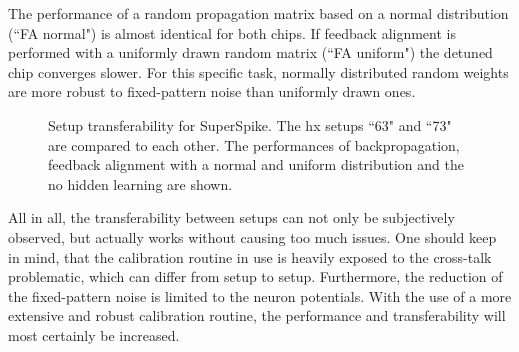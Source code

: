The performance of a random propagation matrix based on a normal distribution (``FA normal") is almost identical for both chips. If feedback alignment is performed with a uniformly drawn random matrix (``FA uniform") the detuned chip converges slower. For this specific task, normally distributed random weights are more robust to fixed-pattern noise than uniformly drawn ones. 
\begin{figure}[htb!]
	\begin{subfigure}{0.245\textwidth}
		\caption{}
		\vspace{-0.3cm}
		\centering
		
		\label{hx63vs73bp}
	\end{subfigure}
	\begin{subfigure}{0.245\textwidth}
		\caption{}
		\vspace{-0.3cm}
		\centering
		
		\label{hx63vs73fanormal}
	\end{subfigure}
	\begin{subfigure}{0.245\textwidth}
		\caption{}
		\vspace{-0.3cm}
		\centering
		
		\label{hx63vs73fauniform}
	\end{subfigure}
	\begin{subfigure}{0.245\textwidth}
		\caption{}
		\vspace{-0.3cm}
		\centering
		
		\label{hx63vs73nohidden}
	\end{subfigure}
	\caption[Setup transferability for SuperSpike.]{Setup transferability for SuperSpike. The \gls{hx} setups ``63" and ``73" are compared to each other. The performances of backpropagation, feedback alignment with a normal and uniform distribution and the no hidden learning are shown.}
	\label{hxsetuptransferability}
\end{figure}
All in all, the transferability between setups can not only be subjectively observed, but actually works without causing too much issues. One should keep in mind, that the calibration routine in use is heavily exposed to the cross-talk problematic, which can differ from setup to setup. Furthermore, the reduction of the fixed-pattern noise is limited to the neuron potentials. With the use of a more extensive and robust calibration routine, the performance and transferability will most certainly be increased. 

